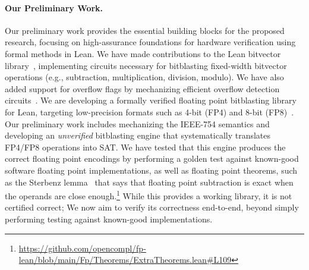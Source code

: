 \documentclass[onecolumn]{article}
\begin{document}

\paragraph{Our Preliminary Work.}

Our preliminary work provides the essential building blocks for the proposed
research, focusing on high-assurance foundations for hardware verification
using formal methods in Lean.
We have made contributions to the Lean bitvector library~\cite{boving2025interactive},
implementing circuits necessary for bitblasting fixed-width bitvector operations (e.g., subtraction, multiplication, division, modulo).
We have also added support for overflow flags by mechanizing efficient overflow detection circuits~\cite{gok2001efficient}.
We are developing a formally verified floating point bitblasting
library for Lean, targeting low-precision formats such as 4-bit (FP4) and
8-bit (FP8)~\cite{fplean}. 
Our preliminary work includes mechanizing the IEEE-754 semantics
and developing an \emph{unverified} bitblasting engine that systematically translates
FP4/FP8 operations into SAT.
We have tested that this engine produces the correct floating point encodings by
performing a golden test against known-good software floating point implementations,
as well as floating point theorems, such as the Sterbenz lemma~\cite{muller2018handbook} that says that floating point 
subtraction is exact when the operands are close enough.\footnote{\url{https://github.com/opencompl/fp-lean/blob/main/Fp/Theorems/ExtraTheorems.lean\#L109}}
While this provides a working library, it is not certified correct;
We now aim to verify its correctness end-to-end,
beyond simply performing testing against known-good implementations.
\end{document}
